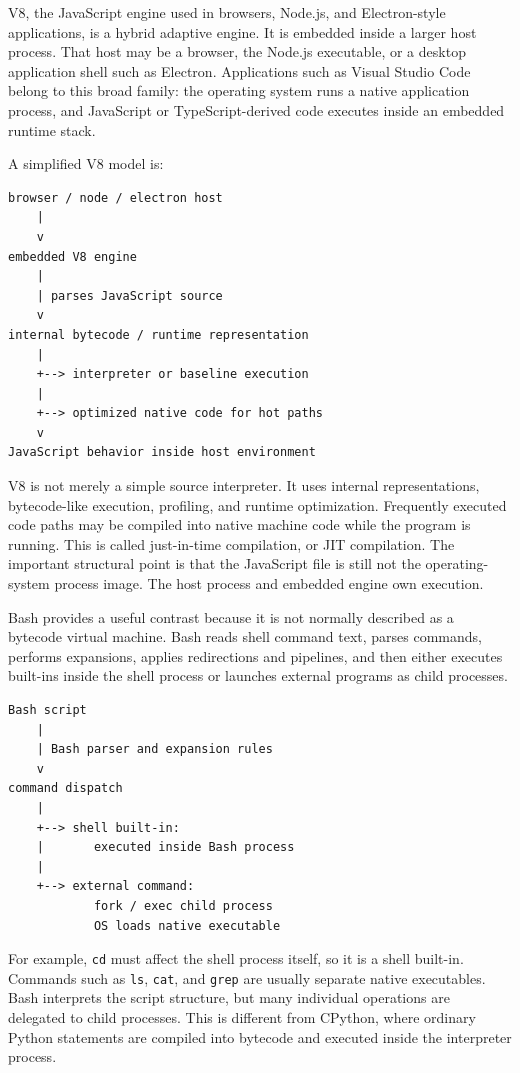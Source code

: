 \documentclass[a4paper,twoside]{report}
\begin{document}
V8, the JavaScript engine used in browsers, Node.js, and Electron-style applications, is a hybrid adaptive engine. It is embedded inside a larger host process. That host may be a browser, the Node.js executable, or a desktop application shell such as Electron. Applications such as Visual Studio Code belong to this broad family: the operating system runs a native application process, and JavaScript or TypeScript-derived code executes inside an embedded runtime stack.

A simplified V8 model is:

\begin{verbatim}
browser / node / electron host
    |
    v
embedded V8 engine
    |
    | parses JavaScript source
    v
internal bytecode / runtime representation
    |
    +--> interpreter or baseline execution
    |
    +--> optimized native code for hot paths
    v
JavaScript behavior inside host environment
\end{verbatim}

V8 is not merely a simple source interpreter. It uses internal representations, bytecode-like execution, profiling, and runtime optimization. Frequently executed code paths may be compiled into native machine code while the program is running. This is called just-in-time compilation, or JIT compilation. The important structural point is that the JavaScript file is still not the operating-system process image. The host process and embedded engine own execution.

Bash provides a useful contrast because it is not normally described as a bytecode virtual machine. Bash reads shell command text, parses commands, performs expansions, applies redirections and pipelines, and then either executes built-ins inside the shell process or launches external programs as child processes.

\begin{verbatim}
Bash script
    |
    | Bash parser and expansion rules
    v
command dispatch
    |
    +--> shell built-in:
    |       executed inside Bash process
    |
    +--> external command:
            fork / exec child process
            OS loads native executable
\end{verbatim}

For example, \texttt{cd} must affect the shell process itself, so it is a shell built-in. Commands such as \texttt{ls}, \texttt{cat}, and \texttt{grep} are usually separate native executables. Bash interprets the script structure, but many individual operations are delegated to child processes. This is different from CPython, where ordinary Python statements are compiled into bytecode and executed inside the interpreter process.
\end{document}
